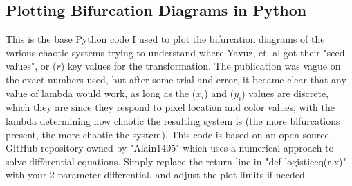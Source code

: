 \subsection{Plotting Bifurcation Diagrams in Python}

This is the base Python code I used to plot the bifurcation diagrams of the various chaotic systems trying to understand where Yavuz, et. al got their "seed values", or ($r$) key values for the transformation.  The publication was vague on the exact numbers used, but after some trial and error, it became clear that any value of lambda would work, as long as the ($x_i$) and ($y_i$) values are discrete, which they are since they respond to pixel location and color values, with the lambda determining how chaotic the resulting system is (the more bifurcations present, the more chaotic the system).  This code is based on an open source GitHub repository owned by "Alain1405" which uses a numerical approach to solve differential equations.  Simply replace the return line in "def logisticeq(r,x)" with your 2 parameter differential, and adjust the plot limits if needed.

